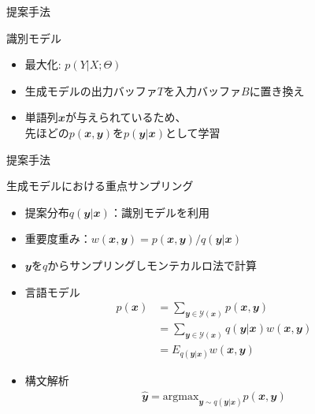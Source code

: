 \documentclass[aspectratio=43,unicode,10pt]{beamer}
\newcommand{\mb}{\mathbfit}
\begin{document}
\begin{frame}{提案手法}
  \begin{block}{識別モデル}
    \begin{itemize}
      \item 最大化: $p(Y | X; \Theta)$
      \item 生成モデルの出力バッファ$T$を入力バッファ$B$に置き換え
      \item 単語列$\mb{x}$が与えられているため、 \\
            先ほどの$p(\mb{x}, \mb{y})$を$p(\mb{y}|\mb{x})$として学習
    \end{itemize}
  \end{block}
\end{frame}

\begin{frame}{提案手法}
  \begin{block}{生成モデルにおける重点サンプリング}
    \begin{itemize}
      \item 提案分布$q(\mb{y}|\mb{x})$：識別モデルを利用
      \item 重要度重み：$w(\mb{x}, \mb{y}) = p(\mb{x}, \mb{y}) / q(\mb{y} | \mb{x})$
      \item $\mb{y}$を$q$からサンプリングしモンテカルロ法で計算
      \item 言語モデル
        \begin{align*}
          p(\mb{x})
          & = \sum_{\mb{y} \in \mathcal{Y}(\mb{x})} p(\mb{x}, \mb{y}) \\
          & = \sum_{\mb{y} \in \mathcal{Y}(\mb{x})} q(\mb{y}|\mb{x}) w(\mb{x}, \mb{y}) \\
          & = E_{q(\mb{y}|\mb{x})} w(\mb{x}, \mb{y})
        \end{align*}
      \item 構文解析
        \begin{gather*}
          \hat{\mb{y}} = \mathrm{argmax}_{\mb{y} \sim q(\mb{y}|\mb{x})} p(\mb{x}, \mb{y})
        \end{gather*}
    \end{itemize}
  \end{block}
\end{frame}
\end{document}
